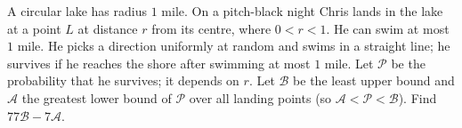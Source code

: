 A circular lake has radius $1$ mile. On a pitch-black night Chris lands in the lake at a point $L$ at distance $r$ from its centre, where $0<r<1$. He can swim at most $1$ mile. He picks a direction uniformly at random and swims in a straight line; he survives if he reaches the shore after swimming at most $1$ mile. Let $\mathcal P$ be the probability that he survives; it depends on $r$. Let $\mathcal B$ be the least upper bound and $\mathcal A$ the greatest lower bound of $\mathcal P$ over all landing points (so $\mathcal A<\mathcal P<\mathcal B$). Find $77\mathcal B-7\mathcal A$.
